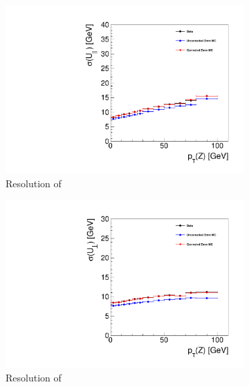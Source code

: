 
\begin{figure}
\centering
\begin{subfigure}{.50\textwidth}
\centering
\includegraphics[width=\linewidth]{plots/Recoil/validation_13/resolution_par.pdf}
 \caption{Resolution of \upar}
\end{subfigure}%
\centering
\begin{subfigure}{.50\textwidth}
\centering
\includegraphics[width=\linewidth]{plots/Recoil/validation_13/resolution_prp.pdf}
\caption{Resolution of \uprp}
\end{subfigure}%
\\
\centering
\begin{subfigure}{.50\textwidth}
\centering

\end{subfigure}
\end{figure}

